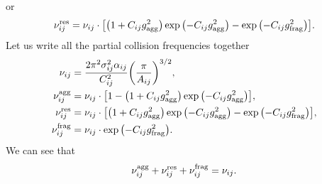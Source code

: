 \documentclass[aps,prl,preprint,groupedaddress,10pt]{revtex4-2}
\begin{document}
or
\begin{equation}
    \utx{\nu_{ij}}{res}=\nu_{ij}\cdot
    \bqty{\pqty{1+C_{ij}\ltx{g}{agg}^2}
    \exp\pqty{-C_{ij}\ltx{g}{agg}^2}-\exp\pqty{-C_{ij}\ltx{g}{frag}^2}}.
\end{equation}
Let us write all the partial collision frequencies together
\begin{equation}
    \begin{split}
        \nu_{ij}&=\frac{2\pi^2\sigma_{ij}^2\alpha_{ij}}{C_{ij}^2}
        \pqty{\frac{\pi}{A_{ij}}}^{3/2},\\
        \utx{\nu_{ij}}{agg}&=\nu_{ij}\cdot
        \bqty{1-\pqty{1+C_{ij}\ltx{g}{agg}^2}\exp\pqty{-C_{ij}\ltx{g}{agg}^2}},\\
        \utx{\nu_{ij}}{res}&=\nu_{ij}\cdot\bqty{\pqty{1+C_{ij}\ltx{g}{agg}^2}
        \exp\pqty{-C_{ij}\ltx{g}{agg}^2}-\exp\pqty{-C_{ij}\ltx{g}{frag}^2}},\\
        \utx{\nu_{ij}}{frag}&=\nu_{ij}\cdot\exp\pqty{-C_{ij}\ltx{g}{frag}^2}.
    \end{split}
\end{equation}
We can see that
\begin{equation}
    \nu_{ij}^{\mathrm{agg}}+\nu_{ij}^{\mathrm{res}}+\nu_{ij}^{\mathrm{frag}}=\nu_{ij}.
\end{equation}
\end{document}
